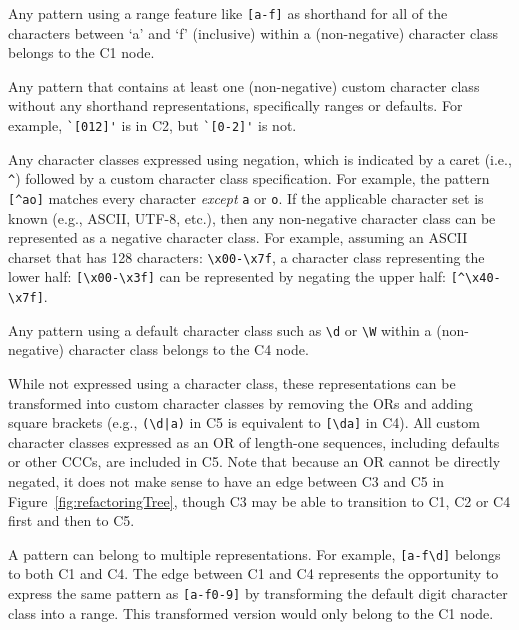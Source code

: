\begin{description}  \itemsep -1pt
\item[C1:] Any pattern using a range feature like \verb![a-f]! as shorthand for all of the characters between `a' and `f' (inclusive) within a (non-negative) character class belongs to the C1 node.

\item[C2:] Any pattern that contains at least one (non-negative) custom character class  without any shorthand representations, specifically ranges or defaults. For example, \verb!`[012]'! is in C2, but \verb!`[0-2]'! is not.

\item[C3:] Any character classes expressed using negation, which is indicated by a caret (i.e., \verb!^!) followed by a custom character class specification.
For example, the pattern \verb![^ao]! matches every character \emph{except} \verb!a! or \verb!o!.  If the applicable character set is known (e.g., ASCII, UTF-8, etc.), then any non-negative character class can be represented as a negative character class.  For example, assuming an ASCII charset that has 128 characters: \verb!\x00-\x7f!, a character class representing the lower half: \verb![\x00-\x3f]! can be represented by negating the upper half: \verb![^\x40-\x7f]!.

\item[C4:] Any pattern using a default character class such as \verb!\d! or \verb!\W! within a (non-negative) character class belongs to the C4 node.

\item[C5:] While not expressed using a character class, these representations can be transformed into custom character classes by removing the ORs and adding square brackets (e.g., \verb!(\d|a)! in C5 is equivalent to \verb![\da]! in C4). All custom character classes expressed as an OR of length-one sequences, including defaults or other CCCs, are included in C5. Note that because an OR cannot be directly negated, it does not make sense to have an edge between C3 and C5 in Figure~\ref{fig:refactoringTree}, though C3 may be able to transition to C1, C2 or C4 first and then to C5.
\end{description}

A pattern can belong to multiple representations. For example,  \verb![a-f\d]! belongs to both C1 and C4.  The edge between C1 and C4 represents the opportunity to express the same pattern as \verb![a-f0-9]! by transforming the default digit character class into a range.  This transformed version would only belong to the C1 node.

